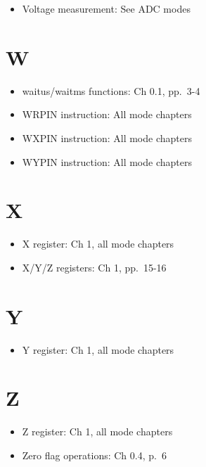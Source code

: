 \documentclass[11pt,a4paper,oneside,english]{book}
\begin{document}
\begin{itemize}
\tightlist
\item
  Voltage measurement: See ADC modes
\end{itemize}

\hypertarget{w}{%
\section{W}\label{w}}

\begin{itemize}
\tightlist
\item
  waitus/waitms functions: Ch 0.1, pp.~3-4
\item
  WRPIN instruction: All mode chapters
\item
  WXPIN instruction: All mode chapters
\item
  WYPIN instruction: All mode chapters
\end{itemize}

\hypertarget{x}{%
\section{X}\label{x}}

\begin{itemize}
\tightlist
\item
  X register: Ch 1, all mode chapters
\item
  X/Y/Z registers: Ch 1, pp.~15-16
\end{itemize}

\hypertarget{y}{%
\section{Y}\label{y}}

\begin{itemize}
\tightlist
\item
  Y register: Ch 1, all mode chapters
\end{itemize}

\hypertarget{z}{%
\section{Z}\label{z}}

\begin{itemize}
\tightlist
\item
  Z register: Ch 1, all mode chapters
\item
  Zero flag operations: Ch 0.4, p.~6
\end{itemize}
\end{document}
